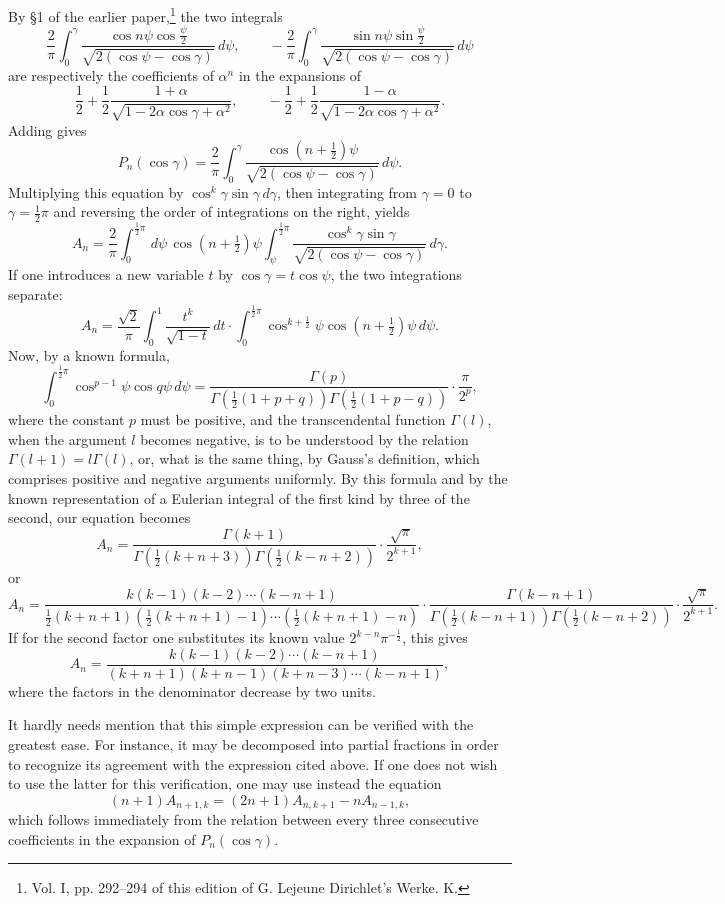 \documentclass[11pt]{article}
\newcommand{\dd}{\,d}
\begin{document}
By §1 of the earlier paper,\footnote{Vol. I, pp. 292--294 of this edition of G. Lejeune Dirichlet's Werke. K.} the two integrals
\[
 \frac{2}{\pi}\int_0^\gamma\frac{\cos n\psi\cos\frac{\psi}{2}}{\sqrt{2(\cos\psi-\cos\gamma)}}\dd\psi,
\qquad
 -\frac{2}{\pi}\int_0^\gamma\frac{\sin n\psi\sin\frac{\psi}{2}}{\sqrt{2(\cos\psi-\cos\gamma)}}\dd\psi
\]
are respectively the coefficients of $\alpha^n$ in the expansions of
\[
 \frac12+\frac12\frac{1+\alpha}{\sqrt{1-2\alpha\cos\gamma+\alpha^2}},
\qquad
 -\frac12+\frac12\frac{1-\alpha}{\sqrt{1-2\alpha\cos\gamma+\alpha^2}}.
\]
Adding gives
\[
 P_n(\cos\gamma)=\frac2\pi\int_0^\gamma\frac{\cos(n+\frac12)\psi}{\sqrt{2(\cos\psi-\cos\gamma)}}\dd\psi.
\]
Multiplying this equation by $\cos^k\gamma\sin\gamma\dd\gamma$, then integrating from $\gamma=0$ to $\gamma=\frac12\pi$ and reversing the order of integrations on the right, yields
\[
 A_n=\frac2\pi\int_0^{\frac12\pi}\dd\psi\,\cos(n+\tfrac12)\psi
 \int_\psi^{\frac12\pi}\frac{\cos^k\gamma\sin\gamma}{\sqrt{2(\cos\psi-\cos\gamma)}}\dd\gamma.
\]
If one introduces a new variable $t$ by $\cos\gamma=t\cos\psi$, the two integrations separate:
\[
 A_n=\frac{\sqrt2}{\pi}\int_0^1\frac{t^k}{\sqrt{1-t}}\dd t\cdot
 \int_0^{\frac12\pi}\cos^{k+\frac12}\psi\cos(n+\tfrac12)\psi\dd\psi.
\]
Now, by a known formula,
\[
 \int_0^{\frac12\pi}\cos^{p-1}\psi\cos q\psi\dd\psi
 =\frac{\Gamma(p)}{\Gamma\left(\frac12(1+p+q)\right)\Gamma\left(\frac12(1+p-q)\right)}\cdot\frac{\pi}{2^p},
\]
where the constant $p$ must be positive, and the transcendental function $\Gamma(l)$, when the argument $l$ becomes negative, is to be understood by the relation $\Gamma(l+1)=l\Gamma(l)$, or, what is the same thing, by Gauss's definition, which comprises positive and negative arguments uniformly. By this formula and by the known representation of a Eulerian integral of the first kind by three of the second, our equation becomes
\[
 A_n=\frac{\Gamma(k+1)}{\Gamma\left(\frac12(k+n+3)\right)\Gamma\left(\frac12(k-n+2)\right)}\cdot\frac{\sqrt\pi}{2^{k+1}},
\]
or
\[
 A_n=\frac{k(k-1)(k-2)\cdots(k-n+1)}{\frac12(k+n+1)\left(\frac12(k+n+1)-1\right)\cdots\left(\frac12(k+n+1)-n\right)}
 \cdot\frac{\Gamma(k-n+1)}{\Gamma\left(\frac12(k-n+1)\right)\Gamma\left(\frac12(k-n+2)\right)}\cdot\frac{\sqrt\pi}{2^{k+1}}.
\]
If for the second factor one substitutes its known value $2^{k-n}\pi^{-\frac12}$, this gives
\[
 A_n=\frac{k(k-1)(k-2)\cdots(k-n+1)}{(k+n+1)(k+n-1)(k+n-3)\cdots(k-n+1)},
\]
where the factors in the denominator decrease by two units.

It hardly needs mention that this simple expression can be verified with the greatest ease. For instance, it may be decomposed into partial fractions in order to recognize its agreement with the expression cited above. If one does not wish to use the latter for this verification, one may use instead the equation
\[
 (n+1)A_{n+1,k}=(2n+1)A_{n,k+1}-nA_{n-1,k},
\]
which follows immediately from the relation between every three consecutive coefficients in the expansion of $P_n(\cos\gamma)$.
\end{document}
